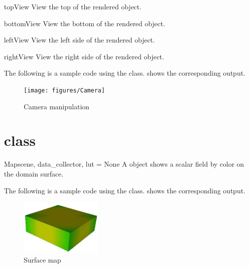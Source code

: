 \begin{methoddesc}[Camera]{topView}{}
View the top of the rendered object.
\end{methoddesc}

\begin{methoddesc}[Camera]{bottomView}{}
View the bottom of the rendered object.
\end{methoddesc}

\begin{methoddesc}[Camera]{leftView}{}
View the left side of the rendered object.
\end{methoddesc}

\begin{methoddesc}[Camera]{rightView}{}
View the right side of the rendered object.
\end{methoddesc}

The following is a sample code using the \Camera class. 
 shows the corresponding output. 


\begin{figure}[ht]
\begin{center}
\texttt{[image: figures/Camera]}
\end{center}
\caption{Camera manipulation}
\label{fig:camera.1}
\end{figure}

\section{\Map class}
\begin{classdesc}{Map}{scene, data_collector, lut = None}
A \Map object shows a scalar field by color on the domain surface.
\end{classdesc}

The following is a sample code using the \Map class. 
 shows the corresponding output. 


\begin{figure}[ht]
\begin{center}
\includegraphics[width=40mm]{figures/Map}
\end{center}
\caption{Surface map}
\label{fig:map.1}
\end{figure}

